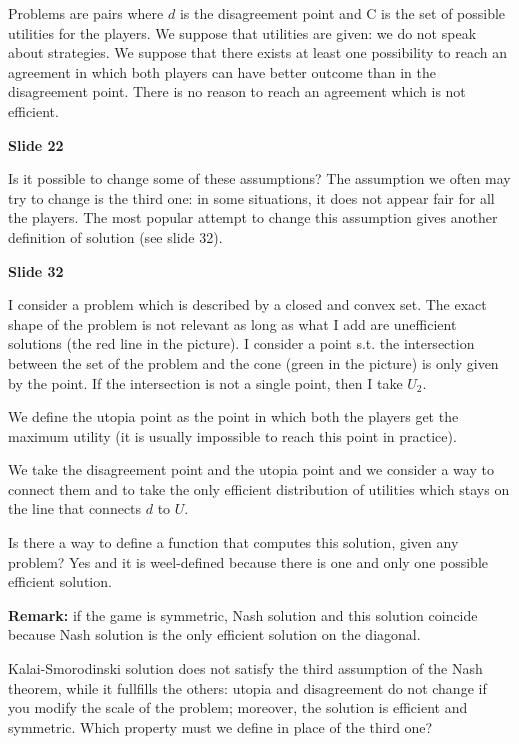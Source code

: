 \documentclass[pt11,a4paper,twoside,reqno,openright]{paper}
\begin{document}

\bigskip
\noindent Problems are pairs where $d$ is the disagreement point and C is the 
set of possible utilities for the players. We suppose that utilities are given: 
we do not speak about strategies. We suppose that there exists at least one 
possibility to reach an agreement in which both players can have better 
outcome than in the disagreement point. There is no reason to reach an 
agreement which is not efficient.

\bigskip
\noindent \textbf{Slide 22}

\noindent Is it possible to change some of these assumptions? The assumption 
we often may try to change is the third one: in some situations, it does not 
appear fair for all the players. The most popular attempt to change this 
assumption gives another definition of solution (see slide 32).

\bigskip
\noindent \textbf{Slide 32}

\noindent I consider a problem which is described by a closed and convex set. 
The exact shape of the problem is not relevant as long as what I add are 
unefficient solutions (the red line in the picture). I consider a point s.t. 
the intersection between the set of the problem and the cone (green in the 
picture) is only given by the point. If the intersection is not a single point, 
then I take $U_2$.

\noindent We define the utopia point as the point in which both the players get 
the maximum utility (it is usually impossible to reach this point in practice). 

\noindent We take the disagreement point and the utopia point and we consider 
a way to connect them and to take the only efficient distribution of utilities 
which stays on the line that connects $d$ to $U$.

\noindent Is there a way to define a function that computes this solution, 
given any problem? Yes and it is weel-defined because there is one and only 
one possible efficient solution.

\noindent \textbf{Remark:} if the game is symmetric, Nash solution and this 
solution coincide because Nash solution is the only efficient solution on the 
diagonal.

\noindent Kalai-Smorodinski solution does not satisfy the third assumption of 
the Nash theorem, while it fullfills the others: utopia and disagreement do not 
change if you modify the scale of the problem; moreover, the solution is 
efficient and symmetric. Which property must we define in place of the third 
one?
\end{document}
